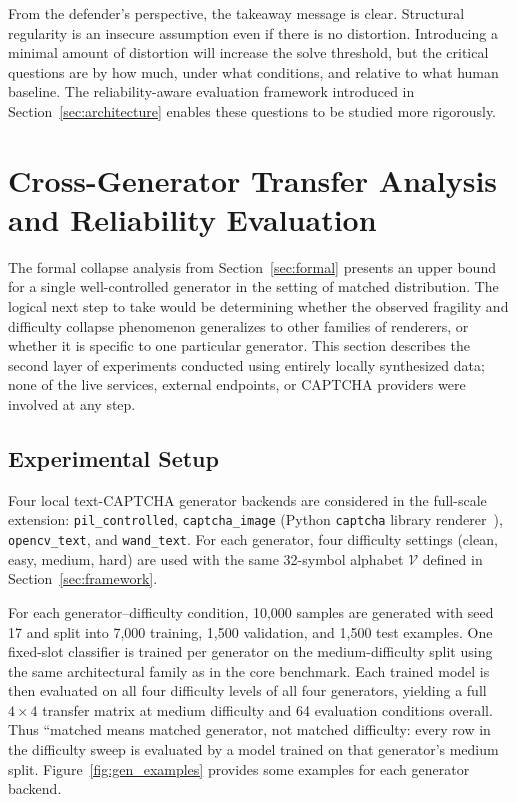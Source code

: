 \documentclass[pdflatex,sn-mathphys-num,iicol]{sn-jnl}
\begin{document}
From the defender's perspective, the takeaway message is clear. Structural regularity is an insecure assumption even if there is no distortion. Introducing a minimal amount of distortion will increase the solve threshold, but the critical questions are by how much, under what conditions, and relative to what human baseline. The reliability-aware evaluation framework introduced in Section~\ref{sec:architecture} enables these questions to be studied more rigorously.
\section{Cross-Generator Transfer Analysis and Reliability Evaluation}
\label{sec:local_extension}

The formal collapse analysis from Section~\ref{sec:formal} presents an upper bound for
a single well-controlled generator in the setting of matched distribution.
The logical next step to take would be determining whether the observed
fragility and difficulty collapse phenomenon generalizes to other families
of renderers, or whether it is specific to one particular generator.
This section describes the second layer of experiments conducted using
entirely locally synthesized data; none of the live services, external
endpoints, or CAPTCHA providers were involved at any step.

\subsection{Experimental Setup}

Four local text-CAPTCHA generator backends are considered in the full-scale
extension: \texttt{pil\_controlled}, \texttt{captcha\_image} (Python
\texttt{captcha} library renderer~\cite{captcha_lib}),
\texttt{opencv\_text}, and \texttt{wand\_text}. For each generator, four
difficulty settings (clean, easy, medium, hard) are used with the same
32-symbol alphabet $\mathcal{V}$ defined in Section~\ref{sec:framework}.

For each generator--difficulty condition, 10,000 samples are generated with
seed 17 and split into 7,000 training, 1,500 validation, and 1,500 test
examples. One fixed-slot classifier is trained per generator on the
medium-difficulty split using the same architectural family as in the core
benchmark. Each trained model is then evaluated on all four difficulty levels
of all four generators, yielding a full $4 \times 4$ transfer matrix at
medium difficulty and 64 evaluation conditions overall. Thus ``matched
means matched generator, not matched difficulty: every row in the difficulty
sweep is evaluated by a model trained on that generator's medium split.
Figure~\ref{fig:gen_examples}
provides some examples for each generator backend.
\end{document}
